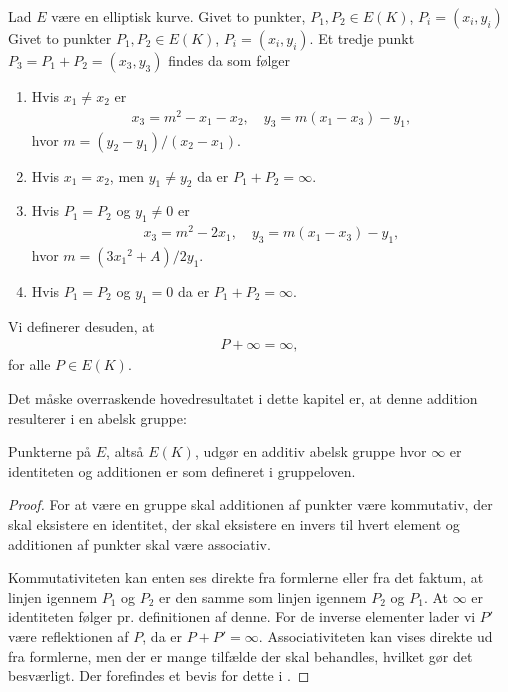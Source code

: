\begin{definition}[Gruppeloven]
Lad $E$ være en elliptisk kurve. Givet to punkter, $P_1, P_2 \in E(K)$, $P_i = (x_i, y_i)$
Givet to punkter $P_1, P_2 \in E(K)$, $P_i = (x_i, y_i)$. Et tredje punkt
$P_3 = P_1 + P_2 = (x_3, y_3)$ findes da som følger
\begin{enumerate}
	\item Hvis $x_1 \neq x_2$ er 
	\begin{align*}
		x_3 = m^2 - x_1 - x_2, \quad y_3 = m(x_1 - x_3) - y_1,
	\end{align*}		
	hvor $m = (y_2 - y_1)/(x_2 - x_1)$.
	\item Hvis $x_1 = x_2$, men $y_1 \neq y_2$ da er $P_1 + P_2 = \infty$.
	\item Hvis $P_1 = P_2$ og $y_1 \neq 0$ er 
	\begin{align*}
		x_3 = m^2 - 2x_1, \quad y_3=m(x_1 - x_3) - y_1,
	\end{align*}
	hvor $m=(3{x_1}^2 + A)/2y_1$.
	\item Hvis $P_1 = P_2$ og $y_1 = 0$ da er $P_1 + P_2 = \infty$.
\end{enumerate}
Vi definerer desuden, at 
\begin{align*}
	P + \infty = \infty,
\end{align*}
for alle $P \in E(K)$.
\end{definition}

Det måske overraskende hovedresultatet i dette kapitel er, at denne addition resulterer i en abelsk gruppe:

\begin{theorem}
Punkterne på $E$, altså $E(K)$, udgør en additiv abelsk gruppe hvor $\infty$ er identiteten og additionen er som defineret i gruppeloven. 
\end{theorem}
\begin{proof}
For at være en gruppe skal additionen af punkter være kommutativ, der skal eksistere en identitet, der skal eksistere en invers til hvert element og additionen af punkter skal være associativ.

Kommutativiteten kan enten ses direkte fra formlerne eller fra det faktum, at linjen igennem $P_1$ og $P_2$ er den samme som linjen igennem $P_2$ og $P_1$. At $\infty$ er identiteten følger pr. definitionen af denne. For de inverse elementer lader vi $P'$ være reflektionen af $P$, da er $P+P' = \infty$. Associativiteten kan vises direkte ud fra formlerne, men der er mange tilfælde der skal behandles, hvilket gør det besværligt. Der forefindes et bevis for dette i \cite[afsnit~2.4]{Washington}.
\end{proof}